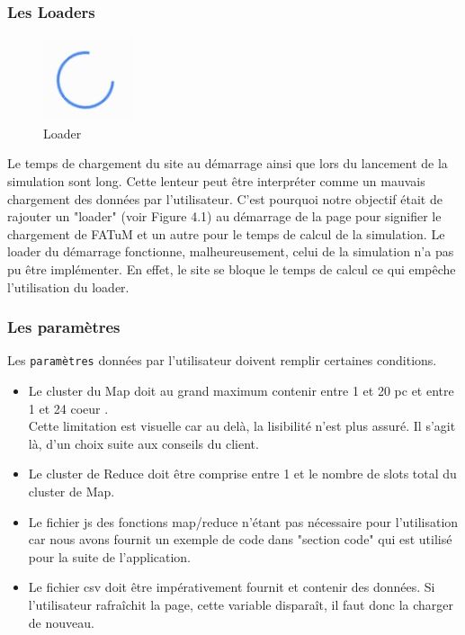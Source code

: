 \subsubsection{Les Loaders}
\begin{figure}[H]
  \centering
    \includegraphics[scale=0.5]{images/loader.png}
        \caption{Loader}
\end{figure}
Le temps de chargement du site au démarrage ainsi que lors du lancement de la simulation sont long. Cette lenteur peut être interpréter comme un mauvais chargement des données par l'utilisateur. C'est pourquoi notre objectif était de rajouter un "loader" (voir Figure 4.1) au démarrage de la page pour signifier le chargement de FATuM et un autre pour le temps de calcul de la simulation. Le loader du démarrage fonctionne, malheureusement, celui de la simulation n'a pas pu être implémenter. En effet, le site se bloque le temps de calcul ce qui empêche l'utilisation du loader.

\subsubsection{Les paramètres}
Les {\tt paramètres} données par l'utilisateur doivent remplir certaines conditions.
\begin{itemize}
\item Le cluster du Map doit au grand maximum contenir entre 1 et 20 pc et entre 1 et 24 coeur . \\ Cette limitation est visuelle car au delà, la lisibilité n'est plus assuré. Il s'agit là, d'un choix suite aux conseils du client.
\item Le cluster de Reduce doit être comprise entre 1 et le nombre de slots total du cluster de Map.
\item Le fichier js des fonctions map/reduce n'étant pas nécessaire pour l'utilisation car nous avons fournit un exemple de code dans "section  code" qui est utilisé pour la suite de l'application.
\item Le fichier csv doit être impérativement fournit et contenir des données.
Si l'utilisateur rafraîchit la page, cette variable disparaît, il faut donc la charger de nouveau.
\end{itemize}


